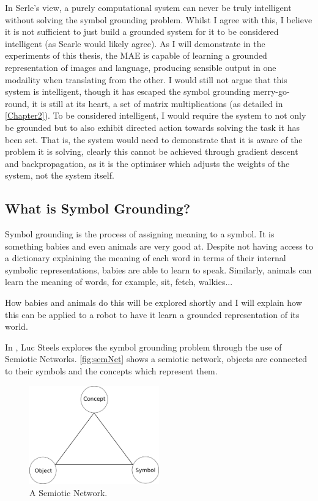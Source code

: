 In Serle's view, a purely computational system can never be truly intelligent without solving the symbol grounding problem. Whilst I agree with this, I believe it is not sufficient to just build a grounded system for it to be considered intelligent (as Searle would likely agree). As I will demonstrate in the experiments of this thesis, the \ac{MAE} is capable of learning a grounded representation of images and language, producing sensible output in one modaility when translating from the other. I would still not argue that this system is intelligent, though it has escaped the symbol grounding merry-go-round, it is still at its heart, a set of matrix multiplications (as detailed in \autoref{Chapter2}). To be considered intelligent, I would require the system to not only be grounded but to also exhibit directed action towards solving the task it has been set. That is, the system would need to demonstrate that it is aware of the problem it is solving, clearly this cannot be achieved through gradient descent and backpropagation, as it is the optimiser which adjusts the weights of the system, not the system itself.

\subsection{What is Symbol Grounding?}
Symbol grounding is the process of assigning meaning to a symbol. It is something babies and even animals are very good at. Despite not having access to a dictionary explaining the meaning of each word in terms of their internal symbolic representations, babies are able to learn to speak. Similarly, animals can learn the meaning of words, for example, sit, fetch, walkies...

How babies and animals do this will be explored shortly and I will explain how this can be applied to a robot to have it learn a grounded representation of its world.

In \cite{steels2008symbol}, Luc Steels explores the symbol grounding problem through the use of Semiotic Networks. \autoref{fig:semNet} shows a semiotic network, objects are connected to their symbols and the concepts which represent them.

\begin{figure}
\centering
\includegraphics[width=0.5\textwidth]{Figs/litReview/semioticNet.png}
\caption{A Semiotic Network.}
\label{fig:semNet}

\end{figure} 

